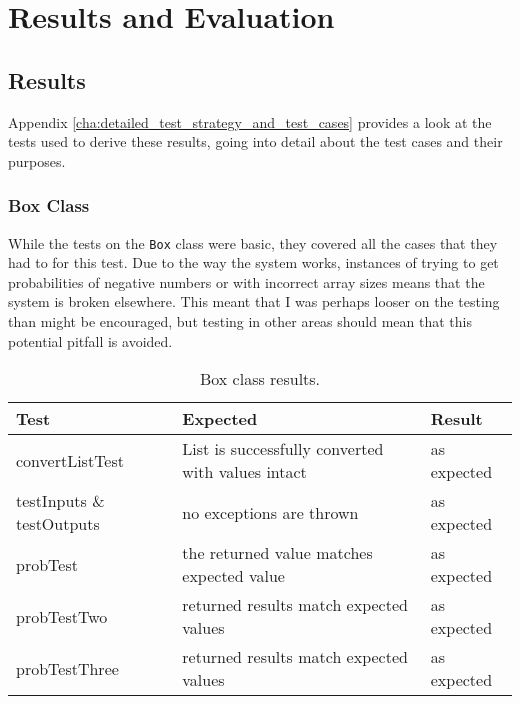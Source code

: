 \documentclass[report.tex]{subfiles}
\begin{document}
\chapter{Results and Evaluation} %
\label{cha:results_and_evaluation}

\section{Results} %
\label{sec:results}
Appendix \ref{cha:detailed_test_strategy_and_test_cases} provides a look at the
tests used to derive these results, going into detail about the test cases and
their purposes.

\subsection{Box Class} %
\label{sub:box_class_res}
While the tests on the \texttt{Box} class were basic, they covered all the cases
that they had to for this test. Due to the way the system works, instances of
trying to get probabilities of negative numbers or with incorrect array sizes
means that the system is broken elsewhere. This meant that I was perhaps looser
on the testing than might be encouraged, but testing in other areas should mean
that this potential pitfall is avoided.

\begin{table}[H]
    \centering
    \begin{tabular}{l | p{6cm} | l}
    Test & Expected & Result \\    
    \hline
    convertListTest & List is successfully converted with values intact
    & as expected \\
    testInputs \& testOutputs & no exceptions are thrown & as expected \\
    probTest & the returned value matches expected value & as expected \\
    probTestTwo & returned results match expected values & as expected \\
    probTestThree & returned results match expected values
    & as expected \\
    \end{tabular}
    \caption{Box class results.}
  \label{tab:box_result}
\end{table}
\end{document}
